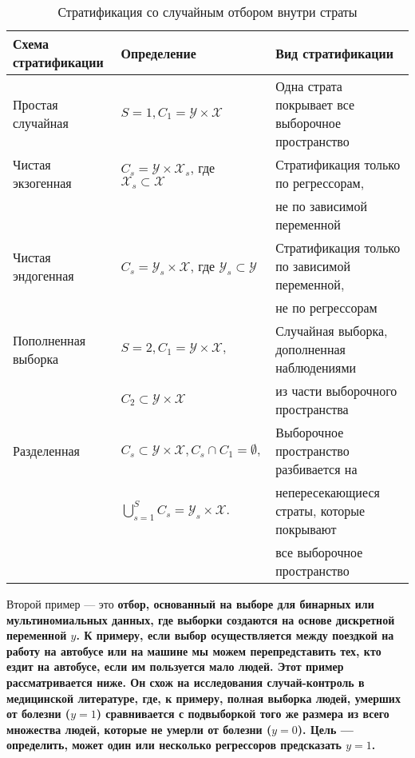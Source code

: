 \begin{table}[h]
\caption{\label{tab:strat} Стратификация со случайным отбором внутри страты}
\begin{center}
\begin{tabular}{lll}
\hline
\hline
 Схема стратификации & Определение & Вид стратификации \\
\hline
Простая случайная & $S = 1, C_1 = \mathcal Y \times \mathcal X$ & Одна страта покрывает все выборочное пространство \\
Чистая экзогенная & $C_s = \mathcal Y \times \mathcal X_s$, где $\mathcal X_s \subset \mathcal X$ &  Стратификация только по регрессорам, \\
& & не по зависимой переменной \\
Чистая эндогенная & $C_s = \mathcal Y_s \times \mathcal X$, где $\mathcal Y_s \subset \mathcal Y$ &  Стратификация только по зависимой переменной, \\
& & не по регрессорам \\
Пополненная выборка & $S = 2, C_1 = \mathcal Y \times \mathcal X,$ & Случайная выборка, дополненная наблюдениями \\
& $C_2 \subset \mathcal Y \times \mathcal X \nonumber$ & из части выборочного пространства \\
Разделенная & $C_s \subset \mathcal Y \times \mathcal X, C_s \cap C_1 = \emptyset,$ & Выборочное пространство разбивается на \\
& $\bigcup_{s=1}^S C_s =  \mathcal Y_s \times \mathcal X.$ & непересекающиеся страты, которые покрывают \\
& & все выборочное пространство \\
\hline
\hline
\end{tabular}
\end{center}
\end{table}

Второй пример --- это \bfseries отбор, основанный на выборе \mdseries для бинарных или мультиномиальных данных, где выборки создаются на основе дискретной переменной $y$. К примеру, если выбор осуществляется между поездкой на работу на автобусе или на машине мы можем перепредставить тех, кто ездит на автобусе, если им пользуется мало людей. Этот пример рассматривается ниже. Он схож на \bfseries исследования случай-контроль \mdseries в медицинской литературе, где, к примеру, полная выборка людей, умерших от болезни ($y=1$) сравнивается с подвыборкой того же размера из всего множества людей, которые не умерли от болезни ($y=0$). Цель --- определить, может один или несколько регрессоров предсказать $y=1$. 

